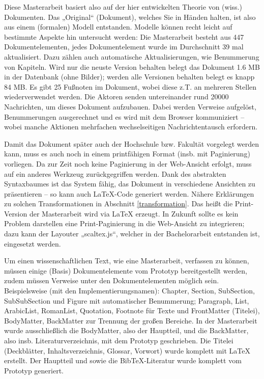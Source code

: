  
Diese Masterarbeit basiert also auf der hier entwickelten Theorie von (wiss.) Dokumenten. Das „Original“ (Dokument), welches Sie in Händen halten, ist also aus einem (formalen) Modell entstanden. Modelle können recht leicht auf bestimmte Aspekte hin untersucht werden: Die Masterarbeit besteht aus 447 Dokumentelementen, jedes Dokumentelement wurde im Durchschnitt 39 mal aktualisiert. Dazu zählen auch automatische Aktualisierungen, wie Benummerung von Kapiteln. Wird nur die neuste Version behalten belegt das Dokument 1.6 MB in der Datenbank (ohne Bilder); werden alle Versionen behalten belegt es knapp 84 MB. Es gibt 25 Fußnoten im Dokument, wobei diese z.T. an mehreren Stellen wiederverwendet werden. Die Aktoren senden untereinander rund 20000 Nachrichten, um dieses Dokument aufzubauen. Dabei werden Verweise aufgelöst, Benummerungen ausgerechnet und es wird mit dem Browser kommuniziert -- wobei manche Aktionen mehrfachen wechselseitigen Nachrichtentausch erfordern.

 
Damit das Dokument später auch der Hochschule bzw. Fakultät vorgelegt werden kann, muss es auch noch in einem printfähigen Format (insb. mit Paginierung) vorliegen.  Da zur Zeit noch keine Paginierung in der Web-Ansicht erfolgt, muss auf ein anderes Werkzeug zurückgegriffen werden. Dank des abstrakten Syntaxbaumes ist das System fähig, das Dokument in verschiedene Ansichten zu präsentieren -- so kann auch LaTeX-Code generiert werden.  Nähere Erklärungen zu solchen Transformationen in Abschnitt \ref{transformation}. Das heißt die Print-Version der Masterarbeit wird via LaTeX erzeugt. In Zukunft sollte es kein Problem darstellen eine Print-Paginierung in die Web-Ansicht zu integrieren; dazu kann der Layouter „scaltex.js“, welcher in der Bachelorarbeit \citep{Hodapp} entstanden ist, eingesetzt werden.

 
Um einen wissenschaftlichen Text, wie eine Masterarbeit, verfassen zu können, müssen einige (Basis) Dokumentelemente vom Prototyp bereitgestellt werden, zudem müssen Verweise unter den Dokumentelementen möglich sein. Beispielsweise (mit den Implementierungsnamen): Chapter, Section, SubSection, SubSubSection und Figure mit automatischer Benummerung; Paragraph, List, ArabicList, RomanList, Quotation, Footnote für Texte und FrontMatter (Titelei), BodyMatter, BackMatter zur Trennung der großen Bereiche. In der Masterarbeit wurde ausschließlich die BodyMatter, also der Hauptteil, und die BackMatter, also insb. Literaturverzeichnis, mit dem Prototyp geschrieben. Die Titelei (Deckblätter, Inhaltsverzeichnis, Glossar, Vorwort) wurde komplett mit LaTeX erstellt. Der Hauptteil und sowie die BibTeX-Literatur wurde komplett vom Prototyp generiert.

